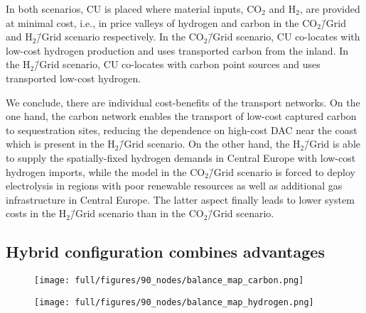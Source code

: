 \documentclass[twocolumn]{article}
\newcommand{\carbon}{CO$_2$}
\newcommand{\hydrogen}{H$_2$}
\newcommand{\carbongrid}{CO$_2$\=/Grid}
\newcommand{\hydrogengrid}{H$_2$\=/Grid}
\newcommand{\carbonscenario}{CO$_2$\=/Grid scenario}
\newcommand{\hydrogenscenario}{H$_2$\=/Grid scenario}
\newcommand{\hybridscenario}{Hybrid scenario}
\begin{document}
In both scenarios, CU is placed where material inputs, \carbon{} and \hydrogen{}, are provided at minimal cost, i.e., in price valleys of hydrogen and carbon in the \carbongrid{} and \hydrogenscenario{} respectively. In the \carbonscenario{}, CU co-locates with low-cost hydrogen production and uses transported carbon from the inland. In the \hydrogenscenario{}, CU co-locates with carbon point sources and uses transported low-cost hydrogen.

We conclude, there are individual cost-benefits of the transport networks. On the one hand, the carbon network enables the transport of low-cost captured carbon to sequestration sites, reducing the dependence on high-cost DAC near the coast which is present in the \hydrogenscenario{}. On the other hand, the \hydrogengrid{} is able to supply the spatially-fixed hydrogen demands in Central Europe with low-cost hydrogen imports, while the model in the \carbonscenario{} is forced to deploy electrolysis in regions with poor renewable resources as well as additional gas infrastructure in Central Europe. The latter aspect finally leads to lower system costs in the \hydrogenscenario{} than in the \carbonscenario{}.



\subsection*{Hybrid configuration combines advantages}\label{subsec:Hybrid}


\begin{figure*}[ht!]
    \centering
    \begin{subfigure}{.5\textwidth}
        \centering
        \texttt{[image: full/figures/90\_nodes/balance\_map\_carbon.png]}
        \label{fig:balance_map_carbon_full}
    \end{subfigure}%
    \begin{subfigure}{.5\textwidth}
        \centering
        \texttt{[image: full/figures/90\_nodes/balance\_map\_hydrogen.png]}
        \label{fig:balance_map_hydrogen_full}
    \end{subfigure}
    \caption{Average operation, flows and prices of the carbon (left) and hydrogen (right) sectors in the \hybridscenario{} assuming net \carbon{} neutrality. For each region, upper semicircles show the average production per technology, lower semicircles the consumption, and colors the average marginal prices. Carbon Sequestration offshore is drawn in full circles. Lines and arrows show interregional transportation. Carbon from point-source in the inland either supplies local CU with imported hydrogen or facilitates sequestration in nearby offshore regions.
    }
    \label{fig:balance_map_full}
\end{figure*}
\end{document}
